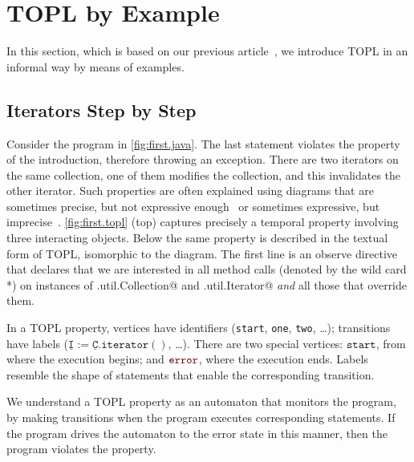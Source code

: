 \documentclass[9pt, preprint]{sigplanconf} %
\newcommand{\error}{\ensuremath{\textcolor{darkred}{\mathtt{error}}}\xspace}
\newcommand{\pattern}[1]{\ensuremath{\mathtt{\underline{#1}}}}
\newcommand{\start}{\ensuremath{\mathtt{start}}\xspace}
\theoremstyle{definition}
\theoremstyle{remark}
\begin{document}

\section{TOPL by Example} \label{sec:examples} %

In this section, which is based on our previous article~\cite{our-fool2011},  we introduce TOPL in an informal way by means of examples.


\subsection{Iterators Step by Step} \label{sec:examples.steps} %

Consider the program in \autoref{fig:first.java}. The last statement violates the property of the introduction, therefore throwing an exception.
There are two iterators on the same collection, one of them modifies the collection, and this invalidates the other iterator.
Such properties are often explained using diagrams that are sometimes precise, but not expressive enough~\cite{dblp:journals/scp/FieldGRY05,dblp:conf/issta/FinkYDRG06} or sometimes expressive, but imprecise~\cite{dblp:conf/oopsla/bierhoffa07,dblp:conf/oopsla/naeeml08,dblp:conf/sigsoft/boddenlh08,dblp:conf/ecoop/bierhoffba09}.
\autoref{fig:first.topl} (top)  captures precisely a temporal property involving three interacting objects.
Below the same property is described in the textual form of TOPL, isomorphic to the diagram.
The first line is an observe directive that declares that we are
interested in all method calls (denoted by the wild card *) on
instances of \Verb@java.util.Collection@ and \Verb@java.util.Iterator@ \emph{and} all those that override them.

In a TOPL property, vertices have identifiers (\texttt{start}, \texttt{one}, \texttt{two}, \dots);
transitions have labels ($\pattern I:=\pattern C.\mathtt{iterator}()$, \dots).
There are two special vertices: \start, from where the execution begins; and \error, where the execution ends.
Labels resemble the shape of statements that enable the corresponding transition.

We understand a TOPL property as an automaton that monitors the
program, by making transitions when the program executes corresponding
statements. If the program drives the automaton to the error state in
this manner, then the program violates the property.
\end{document}

